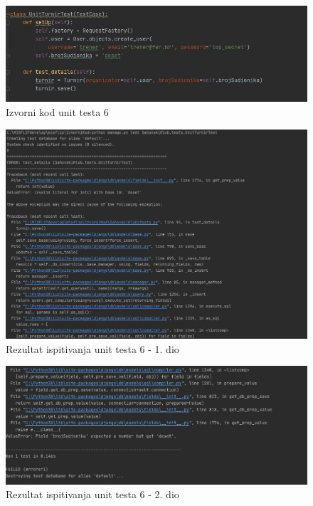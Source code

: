 \begin{figure}[H]
	\centerfloat
	\includegraphics[scale=0.55]{slike/unittest6izv.jpeg} %
	\caption{Izvorni kod unit testa 6}
	
\end{figure}

\begin{figure}[H]
	\centerfloat
	\includegraphics[scale=0.55]{slike/unittest6-1.jpeg} %
	\caption{Rezultat ispitivanja unit testa 6 - 1. dio}
	
\end{figure}

\begin{figure}[H]
	\centerfloat
	\includegraphics[scale=0.55]{slike/unittest6-2.jpeg} %
	\caption{Rezultat ispitivanja unit testa 6 - 2. dio}
\end{figure}
		
